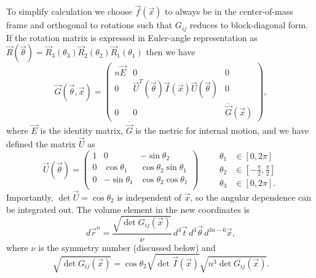 \documentclass[11pt,twoside]{report}
\begin{document}
To simplify calculation we choose $\vec{f}(\vec{x})$ to always be in the center-of-mass frame and orthogonal to rotations such that $G_{ij}$ reduces to block-diagonal form.
If the rotation matrix is expressed in Euler-angle representation as $\vec{R}(\vec{\theta}) = \vec{R}_3(\theta_3) \vec{R}_2(\theta_2) \vec{R}_1(\theta_1)$ then we have
\begin{equation}
  \vec{G}(\vec{\theta}, \vec{x})
  =
  \begin{pmatrix}
    n \vec{E} & 0 & 0 \\
    0 & \vec{U}^T(\vec{\theta}) \vec{I}(\vec{x}) \vec{U}(\vec{\theta}) & 0 \\
    0 & 0 & \overline{\vec{G}}(\vec{x})
  \end{pmatrix},
\end{equation}
where $\vec{E}$ is the identity matrix, $\overline{\vec{G}}$ is the metric for internal motion, and we have defined the matrix $\vec{U}$ as%
\begin{equation}
  \vec{U}(\vec{\theta})
  =
  \begin{pmatrix}
    1 &  0              & -\sin{\theta_2} \\
    0 &  \cos{\theta_1} &  \cos{\theta_2} \sin{\theta_1} \\
    0 & -\sin{\theta_1} &  \cos{\theta_2} \cos{\theta_1} \\
  \end{pmatrix}
  \qquad
  \begin{aligned}
    \theta_1 &\in [0,2\pi] \\
    \theta_2 &\in \left[-\frac{\pi}{2},\frac{\pi}{2}\right] \\
    \theta_3 &\in [0,2\pi].
  \end{aligned}
\end{equation}
Importantly, $\det{\vec{U}} = \cos{\theta_2}$ is independent of $\vec{x}$, so the angular dependence can be integrated out.
The volume element in the new coordinates is
\begin{equation}
  d\vec{r}^n
  =
  \frac{\sqrt{\det G_{ij}(\vec{x})}}{\nu}
  \, d^3 \vec{t} \, d^3 \vec{\theta} \, d^{3n-6} \vec{x},
\end{equation}
where $\nu$ is the symmetry number (discussed below) and
\begin{equation}
  \sqrt{\det G_{ij}(\vec{x})}
  =
  \cos{\theta_2} \sqrt{\det{\vec{I}(\vec{x})}}
  \sqrt{n^3 \det{\overline{G_{ij}}(\vec{x})}}.
\end{equation}
\end{document}
